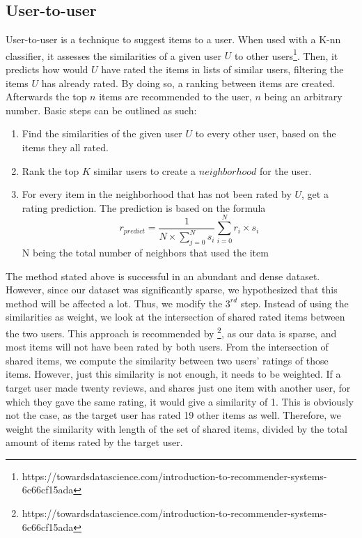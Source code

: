 \documentclass[11pt]{article}
\begin{document}
\subsection{User-to-user}
User-to-user is a technique to suggest items to a user. When used with a K-nn classifier, it assesses the similarities of a given user $U$ to other users\footnote[1]{https://towardsdatascience.com/introduction-to-recommender-systems-6c66cf15ada}. Then, it predicts how would $U$ have rated the items in lists of similar users, filtering the items $U$ has already rated. By doing so, a ranking between items are created. Afterwards the top $n$ items are recommended to the user, $n$ being an arbitrary number. Basic steps can be outlined as such:
\begin{enumerate}
	\item Find the similarities of the given user $U$ to every other user, based on the items they all rated.
	\item Rank the top $K$ similar users to create a $neighborhood$ for the user.
	\item For every item in the neighborhood that has not been rated by $U$, get a rating prediction. The prediction is based on the formula $$r_{predict}=\frac{1}{N\times\sum_{j=0}^{N}s_i}\sum_{i=0}^{N}r_i\times s_i$$N being the total number of neighbors that used the item
\end{enumerate}
The method stated above is successful in an abundant and dense dataset. However, since our dataset was significantly sparse, we hypothesized that this method will be affected a lot. Thus, we modify the $3^{rd}$ step. Instead of using the similarities as weight, we look at the intersection of shared rated items between the two users. This approach is recommended by \footnote[2]{https://towardsdatascience.com/introduction-to-recommender-systems-6c66cf15ada}, as our data is sparse, and most items will not have been rated by both users. From the intersection of shared items, we compute the similarity between two users' ratings of those items. However, just this similarity is not enough, it needs to be weighted. If a target user made twenty reviews, and shares just one item with another user, for which they gave the same rating, it would give a similarity of 1. This is obviously not the case, as the target user has rated 19 other items as well. Therefore, we weight the similarity with length of the set of shared items, divided by the total amount of items rated by the target user. 
\end{document}
